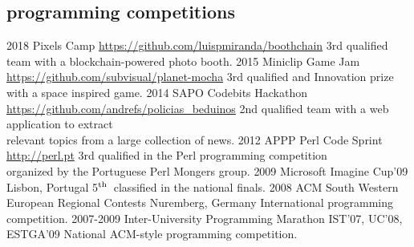 \documentclass[a4paper]{friggeri-cv}
\begin{document}
\subsection{programming competitions}{}
\begin{entrylist}
  \entry
    {2018}
    {Pixels Camp}
    {\href{https://github.com/luispmiranda/boothchain}{https://github.com/luispmiranda/boothchain}}
    {3rd qualified team with a blockchain-powered photo booth.}
    {\vspace{-.4cm}}
  \entry
    {2015}
    {Miniclip Game Jam}
    {\href{https://github.com/subvisual/planet-mocha}{https://github.com/subvisual/planet-mocha}}
    {3rd qualified and Innovation prize with a space inspired game.}
    {\vspace{-.4cm}}
  \entry
    {2014}
    {SAPO Codebits Hackathon}
    {\href{https://github.com/andrefs/policias\_beduinos}{https://github.com/andrefs/policias\_beduinos}}
    {2nd qualified team with a web application to extract\\
    relevant topics from a large collection of news.}
    {\vspace{-.4cm}}
  \entry
    {2012}
    {APPP Perl Code Sprint}
    {\href{http://perl.pt}{http://perl.pt}}
    {3rd qualified in the Perl programming competition\\organized by the Portuguese Perl Mongers group.}
    {\vspace{-.4cm}}
  \entry
    {2009}
    {Microsoft Imagine Cup'09}
    {Lisbon, Portugal}
    {5$^{\footnotesize\textrm{th}}$~classified in the national finals.}
    {\vspace{-.4cm}}
  \entry
    {2008}
    {ACM South Western European Regional Contests}
    {Nuremberg, Germany}
    {International programming competition.}
    {\vspace{-.4cm}}
  \entry
    {2007-2009}
    {Inter-University Programming Marathon}
    {IST'07, UC'08, ESTGA'09}
    {National ACM-style programming competition.}
    {\vspace{-.4cm}}
\end{entrylist}

\newpage
\end{document}
